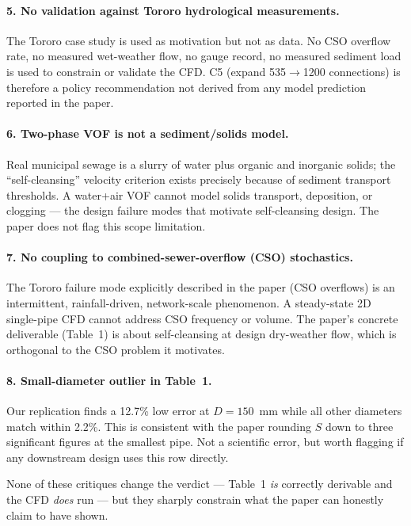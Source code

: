 \documentclass[11pt,a4paper]{article}
\begin{document}
\paragraph{5. No validation against Tororo hydrological measurements.}
The Tororo case study is used as motivation but not as data. No CSO overflow
rate, no measured wet-weather flow, no gauge record, no measured sediment
load is used to constrain or validate the CFD. C5 (expand 535$\to$1200
connections) is therefore a policy recommendation not derived from any
model prediction reported in the paper.

\paragraph{6. Two-phase VOF is not a sediment/solids model.}
Real municipal sewage is a slurry of water plus organic and inorganic
solids; the ``self-cleansing'' velocity criterion exists precisely because
of sediment transport thresholds. A water+air VOF cannot model solids
transport, deposition, or clogging --- the design failure modes that
motivate self-cleansing design. The paper does not flag this scope
limitation.

\paragraph{7. No coupling to combined-sewer-overflow (CSO) stochastics.}
The Tororo failure mode explicitly described in the paper (CSO overflows)
is an intermittent, rainfall-driven, network-scale phenomenon. A steady-state
2D single-pipe CFD cannot address CSO frequency or volume. The paper's
concrete deliverable (Table~1) is about self-cleansing at design dry-weather
flow, which is orthogonal to the CSO problem it motivates.

\paragraph{8. Small-diameter outlier in Table~1.}
Our replication finds a 12.7\% low error at $D=150$~mm while all other
diameters match within 2.2\%. This is consistent with the paper rounding
$S$ down to three significant figures at the smallest pipe. Not a
scientific error, but worth flagging if any downstream design uses this
row directly.

\bigskip
\noindent None of these critiques change the verdict --- Table~1
\emph{is} correctly derivable and the CFD \emph{does} run --- but they
sharply constrain what the paper can honestly claim to have shown.
\end{document}
